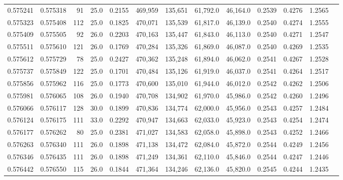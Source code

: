 \begin{tabular}{rrrrrrrrrrrrr}
0.575241 & 0.575318 &    91 & 25.0 &                                     0.2155 & 469,959 & 135,651 &  61,792.0 &  46,164.0 & 0.2539 & 0.4276 & 1.2565 \\
0.575323 & 0.575408 &   112 & 25.0 &                                     0.1825 & 470,071 & 135,539 &  61,817.0 &  46,139.0 & 0.2540 & 0.4274 & 1.2555 \\
0.575409 & 0.575505 &    92 & 26.0 &                                     0.2203 & 470,163 & 135,447 &  61,843.0 &  46,113.0 & 0.2540 & 0.4271 & 1.2547 \\
0.575511 & 0.575610 &   121 & 26.0 &                                     0.1769 & 470,284 & 135,326 &  61,869.0 &  46,087.0 & 0.2540 & 0.4269 & 1.2535 \\
0.575612 & 0.575729 &    78 & 25.0 &                                     0.2427 & 470,362 & 135,248 &  61,894.0 &  46,062.0 & 0.2541 & 0.4267 & 1.2528 \\
0.575737 & 0.575849 &   122 & 25.0 &                                     0.1701 & 470,484 & 135,126 &  61,919.0 &  46,037.0 & 0.2541 & 0.4264 & 1.2517 \\
0.575856 & 0.575962 &   116 & 25.0 &                                     0.1773 & 470,600 & 135,010 &  61,944.0 &  46,012.0 & 0.2542 & 0.4262 & 1.2506 \\
0.575981 & 0.576065 &   108 & 26.0 &                                     0.1940 & 470,708 & 134,902 &  61,970.0 &  45,986.0 & 0.2542 & 0.4260 & 1.2496 \\
0.576066 & 0.576117 &   128 & 30.0 &                                     0.1899 & 470,836 & 134,774 &  62,000.0 &  45,956.0 & 0.2543 & 0.4257 & 1.2484 \\
0.576124 & 0.576175 &   111 & 33.0 &                                     0.2292 & 470,947 & 134,663 &  62,033.0 &  45,923.0 & 0.2543 & 0.4254 & 1.2474 \\
0.576177 & 0.576262 &    80 & 25.0 &                                     0.2381 & 471,027 & 134,583 &  62,058.0 &  45,898.0 & 0.2543 & 0.4252 & 1.2466 \\
0.576263 & 0.576340 &   111 & 26.0 &                                     0.1898 & 471,138 & 134,472 &  62,084.0 &  45,872.0 & 0.2544 & 0.4249 & 1.2456 \\
0.576346 & 0.576435 &   111 & 26.0 &                                     0.1898 & 471,249 & 134,361 &  62,110.0 &  45,846.0 & 0.2544 & 0.4247 & 1.2446 \\
0.576442 & 0.576550 &   115 & 26.0 &                                     0.1844 & 471,364 & 134,246 &  62,136.0 &  45,820.0 & 0.2545 & 0.4244 & 1.2435 \\

\end{tabular}
